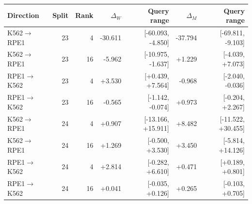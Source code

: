 \begin{tabular}{lrrrrrr}
\toprule
Direction & Split & Rank & $\Delta_W$ & Query range & $\Delta_M$ & Query range \\
\midrule
K562$\to$RPE1 & 23 & 4 & -30.611 & [-60.093, -4.850] & -37.794 & [-69.811, -9.103] \\
K562$\to$RPE1 & 23 & 16 & -5.962 & [-10.975, -1.637] & +1.229 & [-4.039, +7.073] \\
RPE1$\to$K562 & 23 & 4 & +3.530 & [+0.439, +7.564] & -0.968 & [-2.040, -0.036] \\
RPE1$\to$K562 & 23 & 16 & -0.565 & [-1.142, -0.074] & +0.973 & [-0.204, +2.267] \\
K562$\to$RPE1 & 24 & 4 & +0.907 & [-13.166, +15.911] & +8.482 & [-11.522, +30.455] \\
K562$\to$RPE1 & 24 & 16 & +1.269 & [-0.500, +3.530] & +3.450 & [-5.814, +14.126] \\
RPE1$\to$K562 & 24 & 4 & +2.814 & [-0.282, +6.610] & +0.471 & [+0.189, +0.801] \\
RPE1$\to$K562 & 24 & 16 & +0.041 & [-0.035, +0.126] & +0.265 & [-0.103, +0.705] \\
\bottomrule
\end{tabular}
